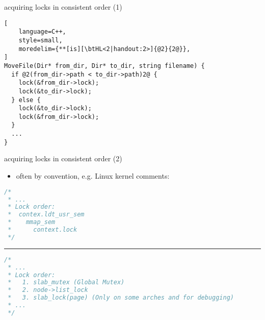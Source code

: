 \usetikzlibrary{matrix}

\begin{frame}[fragile,label=moveFileOrdering]{acquiring locks in consistent order (1)}
\begin{lstlisting}[
    language=C++,
    style=small,
    moredelim={**[is][\btHL<2|handout:2>]{@2}{2@}},
]
MoveFile(Dir* from_dir, Dir* to_dir, string filename) {
  if @2(from_dir->path < to_dir->path)2@ {
    lock(&from_dir->lock);
    lock(&to_dir->lock);
  } else {
    lock(&to_dir->lock);
    lock(&from_dir->lock);
  }
  ...
}
\end{lstlisting}
\end{frame}

\begin{frame}[fragile,label=linuxOrdering]{acquiring locks in consistent order (2)}
\begin{itemize}
\item often by convention, e.g. Linux kernel comments:
\end{itemize}
\begin{lstlisting}[language=C++,style=smaller]
/*
 * ...
 * Lock order:
 *	contex.ldt_usr_sem
 *	  mmap_sem
 *	    context.lock
 */
\end{lstlisting}
\hrule
\begin{lstlisting}[language=C++,style=smaller]
/*
 * ...
 * Lock order:
 *   1. slab_mutex (Global Mutex)
 *   2. node->list_lock
 *   3. slab_lock(page) (Only on some arches and for debugging)
 * ...
 */
 \end{lstlisting}
\end{frame}


